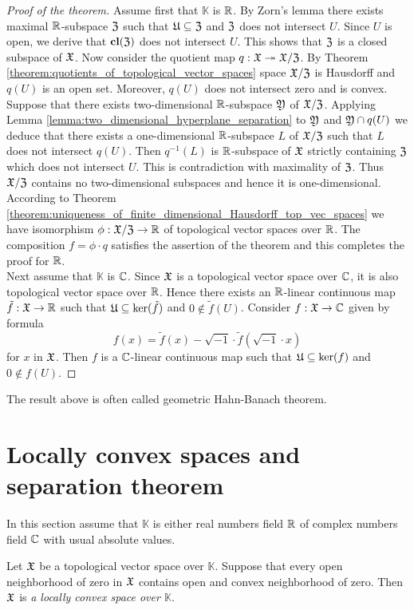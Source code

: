 \begin{proof}[Proof of the theorem]
Assume first that $\mathbb{K}$ is ${\mathbb R}$. By Zorn's lemma there exists maximal ${\mathbb R}$-subspace ${\mathfrak Z}$ such that ${\mathfrak U}\subseteq {\mathfrak Z}$ and ${\mathfrak Z}$ does not intersect $U$. Since $U$ is open, we derive that $\mathbf{cl}({\mathfrak Z})$ does not intersect $U$. This shows that ${\mathfrak Z}$ is a closed subspace of ${\mathfrak X}$. Now consider the quotient map $q:{\mathfrak X}\twoheadrightarrow {\mathfrak X}/{\mathfrak Z}$. By Theorem \ref{theorem:quotients_of_topological_vector_spaces} space ${\mathfrak X}/{\mathfrak Z}$ is Hausdorff and $q(U)$ is an open set. Moreover, $q(U)$ does not intersect zero and is convex. Suppose that there exists two-dimensional ${\mathbb R}$-subspace ${\mathfrak Y}$ of ${\mathfrak X}/{\mathfrak Z}$. Applying Lemma \ref{lemma:two_dimensional_hyperplane_separation} to ${\mathfrak Y}$ and ${\mathfrak Y}\cap q(U)$ we deduce that there exists a one-dimensional ${\mathbb R}$-subspace $L$ of ${\mathfrak X}/{\mathfrak Z}$ such that $L$ does not intersect $q(U)$. Then $q^{-1}(L)$ is ${\mathbb R}$-subspace of ${\mathfrak X}$ strictly containing ${\mathfrak Z}$ which does not intersect $U$. This is contradiction with maximality of ${\mathfrak Z}$. Thus ${\mathfrak X}/{\mathfrak Z}$ contains no two-dimensional subspaces and hence it is one-dimensional. According to Theorem \ref{theorem:uniqueness_of_finite_dimensional_Hausdorff_top_vec_spaces} we have isomorphism $\phi:{\mathfrak X}/{\mathfrak Z} \rightarrow {\mathbb R}$ of topological vector spaces over ${\mathbb R}$. The composition $f = \phi \cdot q$ satisfies the assertion of the theorem and this completes the proof for ${\mathbb R}$.\\
Next assume that $\mathbb{K}$ is ${\mathbb C}$. Since ${\mathfrak X}$ is a topological vector space over ${\mathbb C}$, it is also topological vector space over ${\mathbb R}$. Hence there exists an ${\mathbb R}$-linear continuous map $\tilde{f}:{\mathfrak X}\rightarrow {\mathbb R}$ such that ${\mathfrak U} \subseteq \mathrm{ker}(\tilde{f})$ and $0 \not \in \tilde{f}(U)$. Consider $f:{\mathfrak X}\rightarrow {\mathbb C}$ given by formula
$$f(x) = \tilde{f}(x) - \sqrt{-1}\cdot \tilde{f}\left(\sqrt{-1}\cdot x\right)$$
for $x$ in ${\mathfrak X}$. Then $f$ is a ${\mathbb C}$-linear continuous map such that ${\mathfrak U}\subseteq \mathrm{ker}(f)$ and $0\not \in f(U)$.
\end{proof}
\noindent
The result above is often called geometric Hahn-Banach theorem.

\section{Locally convex spaces and separation theorem}
\noindent
In this section assume that $\mathbb{K}$ is either real numbers field ${\mathbb R}$ of complex numbers field ${\mathbb C}$ with usual absolute values.

\begin{definition}
Let ${\mathfrak X}$ be a topological vector space over $\mathbb{K}$. Suppose that every open neighborhood of zero in ${\mathfrak X}$ contains open and convex neighborhood of zero. Then ${\mathfrak X}$ is \textit{a locally convex space over $\mathbb{K}$}.
\end{definition}

